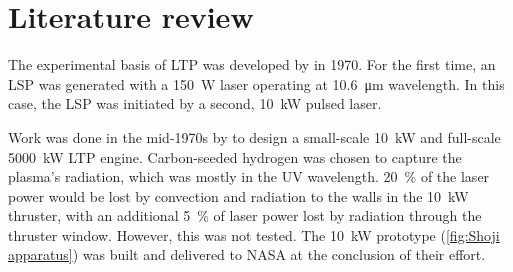     \section{Literature review}


        The experimental basis of LTP was developed by \textcite{generalovContinuousOpticalDischarge1970} in 1970. For the first time, an LSP was generated with a \qty{150}{W}  laser operating at \qty{10.6}{μm} wavelength. In this case, the LSP was initiated by a second, \qty{10}{kW} pulsed  laser.
        

        Work was done in the mid-1970s by \textcite{shojiLaserheatedRocketThruster1977,shojiPerformanceHeatTransfer1976a} to design a small-scale \qty{10}{kW} and full-scale \qty{5000}{kW} LTP engine. Carbon-seeded hydrogen was chosen to capture the plasma's radiation, which was mostly in the UV wavelength. \qty{20}{\%} of the laser power would be lost by convection and radiation to the walls in the \qty{10}{kW} thruster, with an additional \qty{5}{\%} of laser power lost by radiation through the thruster window. However, this was not tested. The \qty{10}{kW} prototype (\autoref{fig:Shoji apparatus}) was built and delivered to NASA at the conclusion of their effort.
